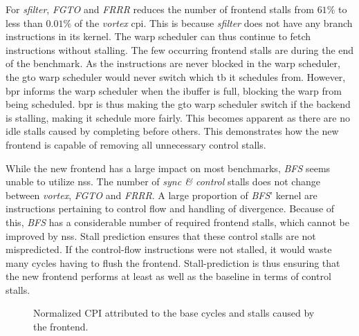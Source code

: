 For \textit{sfilter}, \textit{FGTO} and \textit{FRRR} reduces the number of frontend stalls from $61\%$ to less than $0.01\%$ of the \textit{\Gls{vortex}} \acrshort{cpi}. This is because \textit{sfilter} does not have any branch instructions in its kernel. The warp scheduler can thus continue to fetch instructions without stalling. The few occurring frontend stalls are during the end of the benchmark. As the instructions are never blocked in the warp scheduler, the \acrshort{gto} warp scheduler would never switch which \acrshort{tb} it schedules from. However, \acrshort{bpr} informs the warp scheduler when the ibuffer is full, blocking the warp from being scheduled. \acrshort{bpr} is thus making the \acrshort{gto} warp scheduler switch if the backend is stalling, making it schedule more fairly. This becomes apparent as there are no idle stalls caused by  completing before others. This demonstrates how the new frontend is capable of removing all unnecessary control stalls.

While the new frontend has a large impact on most benchmarks, \textit{BFS} seems unable to utilize \acrshort{nss}. The number of \textit{sync \& control} stalls does not change between \textit{\Gls{vortex}}, \textit{FGTO} and \textit{FRRR}. A large proportion of \textit{BFS}' kernel are instructions pertaining to control flow and handling of divergence. Because of this, \textit{BFS} has a considerable number of required frontend stalls, which cannot be improved by \acrshort{nss}. Stall prediction ensures that these control stalls are not mispredicted. If the control-flow instructions were not stalled, it would waste many cycles having to flush the frontend. Stall-prediction is thus ensuring that the new frontend performs at least as well as the baseline in terms of control stalls. 

\begin{figure}
    \centering
    \caption[Normalized \acrshort{cpi} attributed to the frontend]{Normalized CPI attributed to the base cycles and stalls caused by the frontend.}
    \label{fig:norm_cpi_frontend}
\end{figure}


